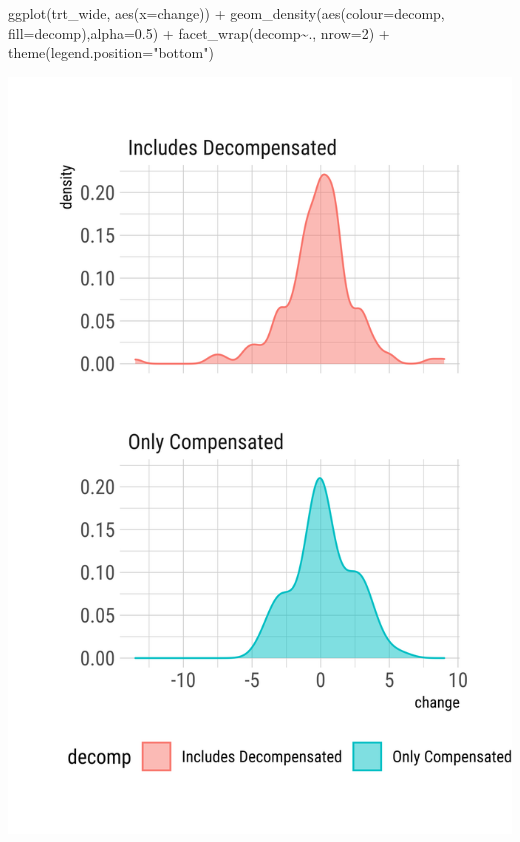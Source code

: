 \documentclass[
]{article}
\newenvironment{Shaded}{\begin{snugshade}}{\end{snugshade}}
\newcommand{\AttributeTok}[1]{\textcolor[rgb]{0.77,0.63,0.00}{#1}}
\newcommand{\DecValTok}[1]{\textcolor[rgb]{0.00,0.00,0.81}{#1}}
\newcommand{\FloatTok}[1]{\textcolor[rgb]{0.00,0.00,0.81}{#1}}
\newcommand{\FunctionTok}[1]{\textcolor[rgb]{0.00,0.00,0.00}{#1}}
\newcommand{\NormalTok}[1]{#1}
\newcommand{\SpecialCharTok}[1]{\textcolor[rgb]{0.00,0.00,0.00}{#1}}
\newcommand{\StringTok}[1]{\textcolor[rgb]{0.31,0.60,0.02}{#1}}
\begin{document}
\begin{Shaded}
\begin{Highlighting}[]
\FunctionTok{ggplot}\NormalTok{(trt\_wide, }\FunctionTok{aes}\NormalTok{(}\AttributeTok{x=}\NormalTok{change)) }\SpecialCharTok{+}
  \FunctionTok{geom\_density}\NormalTok{(}\FunctionTok{aes}\NormalTok{(}\AttributeTok{colour=}\NormalTok{decomp, }\AttributeTok{fill=}\NormalTok{decomp),}\AttributeTok{alpha=}\FloatTok{0.5}\NormalTok{) }\SpecialCharTok{+}
  \FunctionTok{facet\_wrap}\NormalTok{(decomp}\SpecialCharTok{\textasciitilde{}}\NormalTok{., }\AttributeTok{nrow=}\DecValTok{2}\NormalTok{) }\SpecialCharTok{+}
  \FunctionTok{theme}\NormalTok{(}\AttributeTok{legend.position=}\StringTok{"bottom"}\NormalTok{)}
\end{Highlighting}
\end{Shaded}

\includegraphics{figures/unnamed-chunk-29-1.png}
\end{document}
